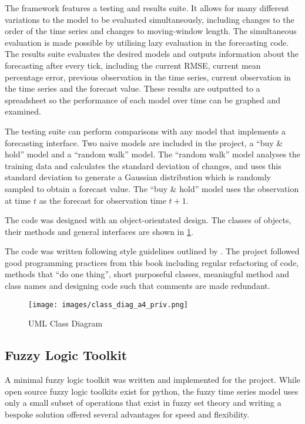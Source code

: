 \documentclass[12pt, oneside, a4paper]{article}
\theoremstyle{definition}
\begin{document}
The framework features a testing and results suite. It allows for many different variations to the model to be evaluated simultaneously, including changes to the order of the time series and changes to moving-window length. The simultaneous evaluation is made possible by utilising lazy evaluation in the forecasting code. The results suite evaluates the desired models and outputs information about the forecasting after every tick, including the current RMSE, current mean percentage error, previous observation in the time series, current observation in the time series and the forecast value. These results are outputted to a spreadsheet so the performance of each model over time can be graphed and examined.

The testing suite can perform comparisons with any model that implements a forecasting interface. Two naive models are included in the project, a ``buy \& hold'' model and a ``random walk'' model. The ``random walk'' model analyses the training data and calculates the standard deviation of changes, and uses this standard deviation to generate a Gaussian distribution which is randomly sampled to obtain a forecast value. The ``buy \& hold'' model uses the observation at time $t$ as the forecast for observation time $t+1$.

The code was designed with an object-orientated design. The classes of objects, their methods and general interfaces are shown in \cref{uml}. 

The code was written following style guidelines outlined by \cite{bobmartin}. The project followed good programming practices from this book including regular refactoring of code, methods that ``do one thing'', short purposeful classes, meaningful method and class names and designing code such that comments are made redundant.

\begin{figure}[H]
    \centering
    \texttt{[image: images/class\_diag\_a4\_priv.png]}
    \caption{UML Class Diagram}
    \label{uml}
\end{figure}
\newpage


\subsection{Fuzzy Logic Toolkit}

A minimal fuzzy logic toolkit was written and implemented for the project. While open source fuzzy logic toolkits exist for python, the fuzzy time series model uses only a small subset of operations that exist in fuzzy set theory and writing a bespoke solution offered several advantages for speed and flexibility.
\end{document}
